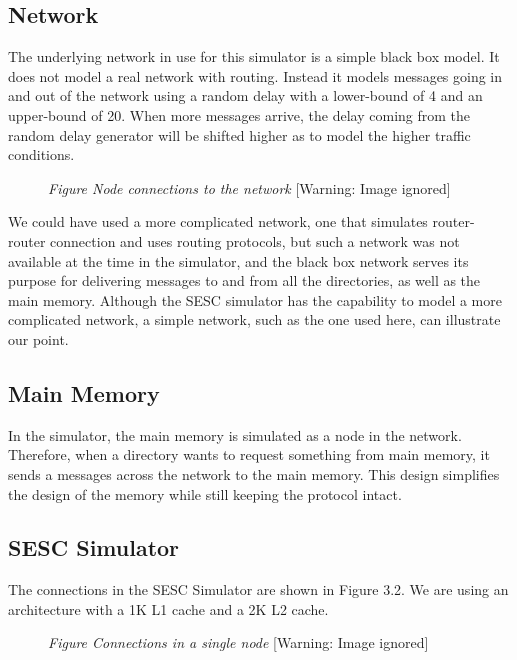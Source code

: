 \documentclass[letterpaper]{article}
\newcounter{Figure}
\renewcommand\theFigure{\arabic{Figure}}
\begin{document}
\subsection[Network]{Network}
The underlying network in use for this simulator is a simple black box model. It does not model a real network with routing. Instead it models messages going in and out of the network using a random delay with a lower-bound of 4 and an upper-bound of 20. When more messages arrive, the delay coming from the random delay generator will be shifted higher as to model the higher traffic conditions.

\begin{figure}
\centering
\begin{minipage}{3.15in}
{\itshape
Figure \stepcounter{Figure}{\theFigure} Node connections to the network}
 [Warning: Image ignored] %
\end{minipage}
\end{figure}
We could have used a more complicated network, one that simulates router-router connection and uses routing protocols, but such a network was not available at the time in the simulator, and the black box network serves its purpose for delivering messages to and from all the directories, as well as the main memory. Although the SESC simulator has the capability to model a more complicated network, a simple network, such as the one used here, can illustrate our point.

\subsection[Main Memory]{\rmfamily Main Memory}
In the simulator, the main memory is simulated as a node in the network. Therefore, when a directory wants to request something from main memory, it sends a messages across the network to the main memory. This design simplifies the design of the memory while still keeping the protocol intact.

\subsection[SESC Simulator]{\rmfamily SESC Simulator}
The connections in the SESC Simulator are shown in Figure 3.2. We are using an architecture with a 1K L1 cache and a 2K L2 cache.

\begin{figure}
\centering
\begin{minipage}{3.15in}
{\itshape
Figure \stepcounter{Figure}{\theFigure} Connections in a single node}
 [Warning: Image ignored] %
\end{minipage}
\end{figure}
\end{document}

